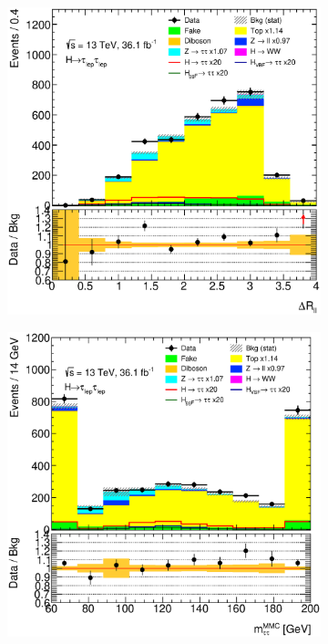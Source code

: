 \begin{figure}[htb]
    \centering
    \begin{subfigure}[t]{0.3\textwidth}
        \includegraphics[width=\textwidth]{./plots/mva/modeling/input_vars/VBF_CR/ll-CutMVAVBFCatTopCR-DeltaRLL-lin.eps}
    \end{subfigure}
    \begin{subfigure}[t]{0.3\textwidth}
        \includegraphics[width=\textwidth]{./plots/mva/modeling/input_vars/VBF_CR/ll-CutMVAVBFCatTopCR-dilep_mmc_mlm_m_ub-lin.eps}

\end{subfigure}
\end{figure}
